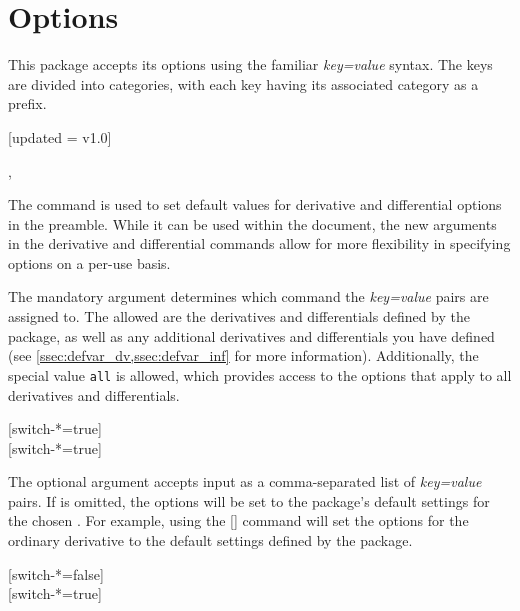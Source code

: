 	\clearpage
	\section{Options}
This package accepts its options using the familiar \emph{key=value} syntax. The keys are divided into categories, with each key having its associated category as a prefix.

\begin{function}{\derivset}[updated = v1.0]
	\begin{syntax}
		, 
	\end{syntax}
	The  command is used to set default values for derivative and differential options in the preamble. While it can be used within the document, the new  arguments in the derivative and differential commands allow for more flexibility in specifying options on a per-use basis.
	
	\begin{argument}{1}
		The mandatory argument determines which command the \emph{key=value} pairs are assigned to. The allowed  are the derivatives and differentials defined by the package, as well as any additional derivatives and differentials you have defined (see \cref{ssec:defvar_dv,ssec:defvar_inf} for more information). Additionally, the special value \texttt{all} is allowed, which provides access to the options that apply to all derivatives and differentials.
		\begin{example}
			\derivset{\odv}[switch-*=true]  \\
			\derivset{\odif}[switch-*=true] 
		\end{example}
	\end{argument}
	
	\begin{argument}{2}
		The optional argument accepts input as a comma-separated list of \emph{key=value} pairs. If  is omitted, the options will be set to the package's default settings for the chosen . For example, using the \macro{\derivset}[\narg{\macro{\odv}}] command will set the options for the ordinary derivative to the default settings defined by the package.
		\begin{example}
			\derivset{\odv}[switch-*=false]  \odv*{y}{x} \\
			\derivset{\odv}[switch-*=true]  \odv*{y}{x} \\
			\derivset{\odv}  \odv*{y}{x}
		\end{example}
	\end{argument}
\end{function}

